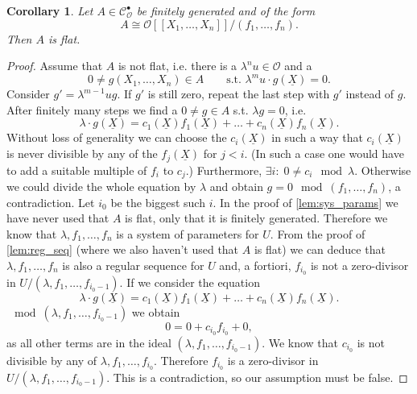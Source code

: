 \documentclass{article}
\theoremstyle{plain}%
\newtheorem{corollary}[theorem]{Corollary}
\theoremstyle{definition}
\theoremstyle{remark}
\newcommand{\cob}{\mathcal{C}_\mathcal{O}^\bullet}
\begin{document}
\begin{corollary}\textup{\cite[corollary 5.12]{Darmon1995}}\label{cor:flatness}
    Let \(A \in \cob\) be finitely generated and of the form
    \[
        A \cong \mathcal{O}[[X_1, \dots, X_n]]/(f_1, \dots, f_n).  
    \]
    Then \(A\) is flat.
\end{corollary}
\begin{proof}
    Assume that \(A\) is not flat, i.e. there is a \(\lambda^n u \in \mathcal{O}\) and a
    \[0 \neq g(X_1, \dots, X_n) \in A \qquad \text{s.t. } \lambda^m u \cdot g(\underline{X}) = 0.\]
    Consider \(g' = \lambda^{m-1}u g\). If \(g'\) is still zero, repeat the last step with \(g'\) instead of \(g\). 
    After finitely many steps we find a \(0 \neq g \in A\) s.t. \(\lambda g = 0\), i.e.
    \[
        \lambda \cdot g(\underline{X}) = c_1(\underline{X})f_1(\underline{X}) + \dots + c_n(\underline{X})f_n(\underline{X}). 
    \]
    Without loss of generality we can choose the \(c_i(\underline{X})\) in such a way that \(c_i(\underline{X})\) 
    is never divisible by any of the \(f_{j}(\underline{X})\) for \(j < i\). 
    (In such a case one would have to add a suitable multiple of \(f_i\) to \(c_j\).)
    Furthermore, \(\exists i\colon\;0 \neq c_i \mod \lambda\). Otherwise we could divide the whole equation by
    \(\lambda\) and obtain \(g = 0 \mod (f_1, \dots, f_n)\), a contradiction. Let \(i_0\) be the biggest such \(i\).
    In the proof of \cref{lem:sys_params} we have never used that \(A\) is flat, 
    only that it is finitely generated. Therefore we know that \(\lambda, f_1, \dots, f_n\) is a system of parameters
    for \(U\). 
    From the proof of \cref{lem:reg_seq} (where we also haven't used that \(A\) is flat) we can deduce that
    \(\lambda, f_1, \dots, f_n\) is also a regular sequence for \(U\) and, a fortiori, \(f_{i_0}\) is not a 
    zero-divisor in \(U/(\lambda, f_1, \dots, f_{i_0-1})\).
    If we consider the equation
    \[
        \lambda \cdot g(\underline{X}) = c_1(\underline{X})f_1(\underline{X}) + \dots + c_n(\underline{X})f_n(\underline{X}). 
    \]
    \(\mod (\lambda, f_1, \dots, f_{i_0-1})\) we obtain
    \[
        0 = 0 + c_{i_0} f_{i_0} + 0,
    \]
    as all other terms are in the ideal \((\lambda, f_1, \dots, f_{i_0-1})\).
    We know that \(c_{i_0}\) is not divisible by any of \(\lambda, f_1, \dots, f_{i_0}\).
    Therefore \(f_{i_0}\) is a zero-divisor in \(U/(\lambda, f_1, \dots, f_{i_0-1})\). This is a contradiction,
    so our assumption must be false.
\end{proof}
\end{document}
